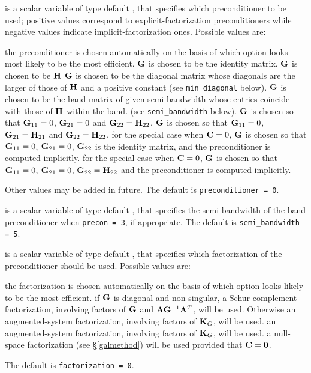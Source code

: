 \documentclass{galahad}
\begin{document}
\begin{description}
 is a scalar variable of type default \integer, 
that specifies which preconditioner to be used;
positive values correspond to explicit-factorization preconditioners 
while negative values indicate implicit-factorization ones. Possible values are:

\begin{description}
 the preconditioner is chosen automatically on the basis of which option 
        looks most likely to be the most efficient.
 ${\mathbf{G}}$ is chosen to be the identity matrix.
 ${\mathbf{G}}$ is chosen to be ${\mathbf{H}}$
 ${\mathbf{G}}$ is chosen to be the diagonal matrix whose diagonals
        are the larger of those of ${\mathbf{H}}$ and a positive constant
        (see {\tt min\_diagonal} below).
 ${\mathbf{G}}$ is chosen to be the band matrix  of given semi-bandwidth
        whose entries coincide with those of ${\mathbf{H}}$ within the band.
        (see {\tt semi\_bandwidth} below).
 ${\mathbf{G}}$ is chosen so that ${\mathbf{G}}_{11} = 0$, ${\mathbf{G}}_{21} = 0$
        and ${\mathbf{G}}_{22} = {\mathbf{H}}_{22}$.
 ${\mathbf{G}}$ is chosen so that ${\mathbf{G}}_{11} = 0$, ${\mathbf{G}}_{21} = {\mathbf{H}}_{21}$
        and ${\mathbf{G}}_{22} = {\mathbf{H}}_{22}$.
 for the special case when ${\mathbf{C}} = 0$,
        ${\mathbf{G}}$ is chosen so that ${\mathbf{G}}_{11} = 0$, ${\mathbf{G}}_{21} = 0$,
        ${\mathbf{G}}_{22}$ is the identity matrix, and the preconditioner is computed
        implicitly.
 for the special case when ${\mathbf{C}} = 0$, 
        ${\mathbf{G}}$ is chosen so that ${\mathbf{G}}_{11} = 0$, ${\mathbf{G}}_{21} = 0$,
        ${\mathbf{G}}_{22} = {\mathbf{H}}_{22}$ and the preconditioner is computed
        implicitly.
\end{description}
Other values may be added in future.
The default is {\tt preconditioner = 0}.

 is a scalar variable of type default \integer, that 
specifies the semi-bandwidth of the band preconditioner when {\tt precon = 3}, 
if appropriate.
The default is {\tt semi\_bandwidth = 5}.

 is a scalar variable of type default \integer, that
specifies which factorization of the preconditioner should be used.  
Possible values are:

\begin{description}
 the factorization is chosen automatically on the basis of which option 
        looks likely to be the most efficient.
 if ${\mathbf{G}}$ is diagonal and non-singular, a Schur-complement
        factorization, involving factors of ${\mathbf{G}}$ and ${\mathbf{A}} {\mathbf{G}}^{-1} {\mathbf{A}}^T$, 
        will be used. Otherwise an augmented-system factorization, involving 
        factors of ${\mathbf{K}}_G$, will be used.
 an augmented-system factorization, involving factors of ${\mathbf{K}}_G$,
        will be used.
 a null-space factorization (see \S\ref{galmethod}) will be used
provided that ${\mathbf{C}} = {\mathbf{0}}$.
\end{description}
The default is {\tt factorization = 0}.


\end{description}
\end{document}
